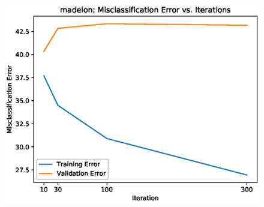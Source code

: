 \documentclass[UTF8]{article}
\begin{document}
\begin{figure}[H]
    \centering
    \includegraphics[scale=0.9]{./figures/madelon-error.eps}
\end{figure}
\end{document}

